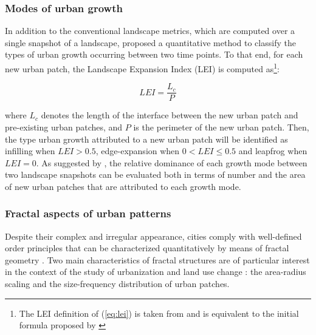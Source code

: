 \subsubsection*{Modes of urban growth}

In addition to the conventional landscape metrics, which are computed over a single snapshot of a landscape, \cite{liu2010new} proposed a quantitative method to classify the types of urban growth occurring between two time points. 
To that end, for each new urban patch, the Landscape Expansion Index (LEI) is computed as\footnote{The LEI definition of (\ref{eq:lei}) is taken from \cite{nong2018quantifying} and is equivalent to the initial formula proposed by \cite{liu2010new}}:

\begin{equation}
  \label{eq:lei}
  LEI = \frac{L_c}{P}
\end{equation}

where $L_c$ denotes the length of the interface between the new urban patch and pre-existing urban patches, and $P$ is the perimeter of the new urban patch. Then, the type urban growth attributed to a new urban patch will be identified as infilling when $LEI > 0.5$, edge-expansion when $0 < LEI \leq 0.5$ and leapfrog when $LEI = 0$.
As suggested by \cite{li2013quantifying}, the relative dominance of each growth mode between two landscape snapshots can be evaluated both in terms of number and the area of new urban patches that are attributed to each growth mode.

\subsubsection*{Fractal aspects of urban patterns}

Despite their complex and irregular appearance, cities comply with well-defined order principles that can be characterized quantitatively by means of fractal geometry \citep{frankhauser1994fractalite, batty1994fractal}.
Two main characteristics of fractal structures are of particular interest in the context of the study of urbanization and land use change \citep{white2015modeling}: the area-radius scaling and the size-frequency distribution of urban patches.

